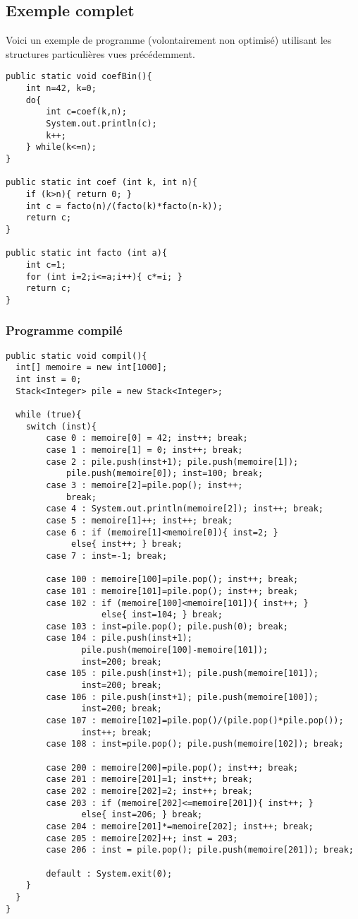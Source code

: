 \documentclass[a4paper,10pt]{book} %
\begin{document}
\subsection{Exemple complet}
Voici un exemple de programme (volontairement non optimisé) utilisant les structures particulières vues précédemment. 

\begin{lstlisting}
public static void coefBin(){
	int n=42, k=0;
	do{
		int c=coef(k,n);
		System.out.println(c);
		k++;
	} while(k<=n);
}

public static int coef (int k, int n){
	if (k>n){ return 0; }
	int c = facto(n)/(facto(k)*facto(n-k));
	return c;
}

public static int facto (int a){
	int c=1;
	for (int i=2;i<=a;i++){ c*=i; }
	return c;
}
\end{lstlisting}

\newpage

\subsubsection{Programme compilé}

\begin{lstlisting}
public static void compil(){
  int[] memoire = new int[1000];
  int inst = 0;
  Stack<Integer> pile = new Stack<Integer>;
	
  while (true){
  	switch (inst){
		case 0 : memoire[0] = 42; inst++; break;
		case 1 : memoire[1] = 0; inst++; break;
		case 2 : pile.push(inst+1); pile.push(memoire[1]); 
			pile.push(memoire[0]); inst=100; break;
		case 3 : memoire[2]=pile.pop(); inst++; 
			break;
		case 4 : System.out.println(memoire[2]); inst++; break;
		case 5 : memoire[1]++; inst++; break;
		case 6 : if (memoire[1]<memoire[0]){ inst=2; }
			 else{ inst++; } break;
		case 7 : inst=-1; break;
		
		case 100 : memoire[100]=pile.pop(); inst++; break;
		case 101 : memoire[101]=pile.pop(); inst++; break;
		case 102 : if (memoire[100]<memoire[101]){ inst++; }
      			   else{ inst=104; } break;
		case 103 : inst=pile.pop(); pile.push(0); break;
		case 104 : pile.push(inst+1);
			   pile.push(memoire[100]-memoire[101]);
			   inst=200; break;
		case 105 : pile.push(inst+1); pile.push(memoire[101]);
			   inst=200; break;
		case 106 : pile.push(inst+1); pile.push(memoire[100]);
			   inst=200; break;
		case 107 : memoire[102]=pile.pop()/(pile.pop()*pile.pop());
			   inst++; break;
		case 108 : inst=pile.pop(); pile.push(memoire[102]); break;
		
		case 200 : memoire[200]=pile.pop(); inst++; break;
		case 201 : memoire[201]=1; inst++; break;
		case 202 : memoire[202]=2; inst++; break;
		case 203 : if (memoire[202]<=memoire[201]){ inst++; }
			   else{ inst=206; } break;
		case 204 : memoire[201]*=memoire[202]; inst++; break;
		case 205 : memoire[202]++; inst = 203;
		case 206 : inst = pile.pop(); pile.push(memoire[201]); break; 
		
		default : System.exit(0);
	}
  }
}
\end{lstlisting}
\end{document}
